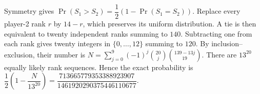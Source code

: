 Symmetry gives $\Pr(S_1>S_2)=\dfrac{1}{2}(1-\Pr(S_1=S_2))$. Replace every player-2 rank $r$ by $14-r$, which preserves its uniform distribution. A tie is then equivalent to twenty independent ranks summing to $140$. Subtracting one from each rank gives twenty integers in $\{0,\ldots,12\}$ summing to $120$. By inclusion--exclusion, their number is $N=\sum_{j=0}^{9}(-1)^j\binom{20}{j}\binom{139-13j}{19}$. There are $13^{20}$ equally likely rank sequences. Hence the exact probability is $\boxed{\dfrac{1}{2}\left(1-\dfrac{N}{13^{20}}\right)}=\boxed{\dfrac{713665779353388923907}{1461920290375446110677}}$.
